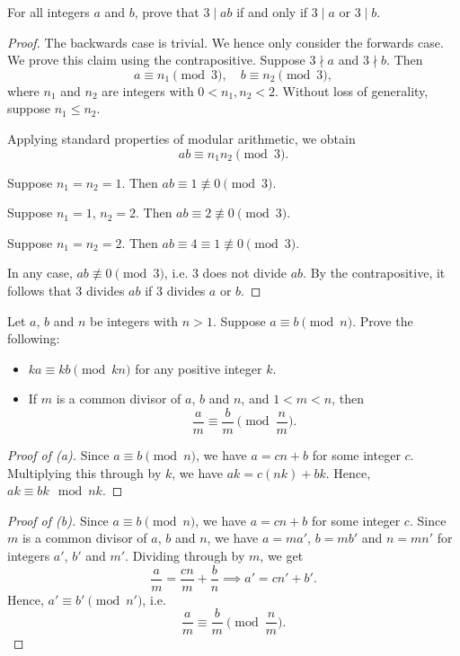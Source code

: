 \clearpage
\begin{problem}
    For all integers $a$ and $b$, prove that $3 \mid ab$ if and only if $3 \mid a$ or $3 \mid b$.
\end{problem}
\begin{solution}
    \begin{proof}
        The backwards case is trivial. We hence only consider the forwards case. We prove this claim using the contrapositive. Suppose $3 \nmid a$ and $3 \nmid b$. Then \[a \equiv n_1 \pmod{3}, \quad b \equiv n_2 \pmod{3},\] where $n_1$ and $n_2$ are integers with $0 < n_1, n_2 < 2$. Without loss of generality, suppose $n_1 \leq n_2$.
        
        Applying standard properties of modular arithmetic, we obtain \[ab \equiv n_1 n_2 \pmod{3}.\]

         Suppose $n_1 = n_2 = 1$. Then $ab \equiv 1 \not\equiv 0 \pmod{3}$.
        
         Suppose $n_1 = 1$, $n_2 = 2$. Then $ab \equiv 2 \not\equiv 0 \pmod{3}$.

         Suppose $n_1 = n_2 = 2$. Then $ab \equiv 4 \equiv 1 \not\equiv 0 \pmod{3}$.

        In any case, $ab \not\equiv 0 \pmod{3}$, i.e. 3 does not divide $ab$. By the contrapositive, it follows that 3 divides $ab$ if 3 divides $a$ or $b$.
    \end{proof}
\end{solution}

\begin{problem}
    Let $a$, $b$ and $n$ be integers with $n > 1$. Suppose $a \equiv b \pmod{n}$. Prove the following:
    \begin{itemize}
        \item $ka \equiv kb \pmod{kn}$ for any positive integer $k$.
        \item If $m$ is a common divisor of $a$, $b$ and $n$, and $1 < m < n$, then \[\frac{a}{m} \equiv \frac{b}{m} \pmod{\frac{n}{m}}.\]
    \end{itemize}
\end{problem}
\begin{solution}
    \begin{proof}[Proof of \emph{(a)}]
        Since $a \equiv b \pmod{n}$, we have $a = cn + b$ for some integer $c$. Multiplying this through by $k$, we have $ak = c(nk) + bk$. Hence, $ak \equiv bk \mod{nk}$.
    \end{proof}
    \begin{proof}[Proof of \emph{(b)}]
        Since $a \equiv b \pmod{n}$, we have $a = cn + b$ for some integer $c$. Since $m$ is a common divisor of $a$, $b$ and $n$, we have $a = ma'$, $b = mb'$ and $n = mn'$ for integers $a'$, $b'$ and $m'$. Dividing through by $m$, we get \[\frac{a}{m} = \frac{cn}{m} + \frac{b}{n} \implies a' = c n' + b'.\] Hence, $a' \equiv b' \pmod{n'}$, i.e. \[\frac{a}{m} \equiv \frac{b}{m} \pmod{\frac{n}{m}}.\]
    \end{proof}
\end{solution}